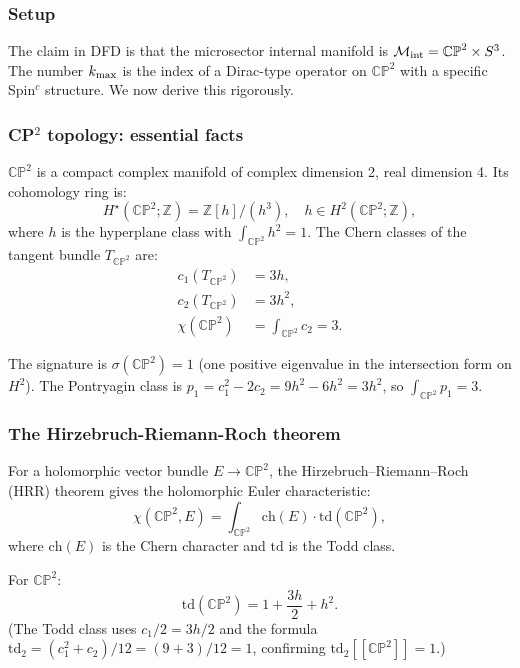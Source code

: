 \documentclass[11pt]{article}
\theoremstyle{definition}
\theoremstyle{remark}
\begin{document}
\subsubsection{Setup}

The claim in DFD is that the microsector internal manifold is
$\mathcal{M}_{\rm int} = \mathbb{CP}^2 \times S^3$. The number $k_{\rm max}$
is the index of a Dirac-type operator on $\mathbb{CP}^2$ with a specific
Spin$^c$ structure. We now derive this rigorously.

\subsubsection{CP$^2$ topology: essential facts}

$\mathbb{CP}^2$ is a compact complex manifold of complex dimension 2, real
dimension 4. Its cohomology ring is:
\begin{equation}
H^\star(\mathbb{CP}^2;\mathbb{Z}) = \mathbb{Z}[h]/(h^3),
\quad h \in H^2(\mathbb{CP}^2;\mathbb{Z}),
\end{equation}
where $h$ is the hyperplane class with $\int_{\mathbb{CP}^2} h^2 = 1$.
The Chern classes of the tangent bundle $T_{\mathbb{CP}^2}$ are:
\begin{align}
c_1(T_{\mathbb{CP}^2}) &= 3h,\\
c_2(T_{\mathbb{CP}^2}) &= 3h^2,\\
\chi(\mathbb{CP}^2) &= \int_{\mathbb{CP}^2} c_2 = 3.
\end{align}

The signature is $\sigma(\mathbb{CP}^2) = 1$ (one positive eigenvalue in the
intersection form on $H^2$). The Pontryagin class is $p_1 = c_1^2 - 2c_2 =
9h^2 - 6h^2 = 3h^2$, so $\int_{\mathbb{CP}^2} p_1 = 3$.

\subsubsection{The Hirzebruch-Riemann-Roch theorem}

For a holomorphic vector bundle $E \to \mathbb{CP}^2$, the
Hirzebruch--Riemann--Roch (HRR) theorem gives the holomorphic Euler
characteristic:
\begin{equation}
\chi(\mathbb{CP}^2, E) = \int_{\mathbb{CP}^2}
\text{ch}(E)\cdot\text{td}(\mathbb{CP}^2),
\end{equation}
where $\text{ch}(E)$ is the Chern character and $\text{td}$ is the Todd class.

For $\mathbb{CP}^2$:
\begin{equation}
\text{td}(\mathbb{CP}^2) = 1 + \frac{3h}{2} + h^2.
\end{equation}
(The Todd class uses $c_1/2 = 3h/2$ and the formula $\text{td}_2 =
(c_1^2 + c_2)/12 = (9+3)/12 = 1$, confirming $\text{td}_2[[\mathbb{CP}^2]] = 1$.)
\end{document}
